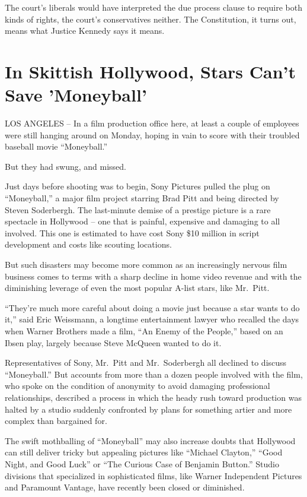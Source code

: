 ﻿\documentclass[12pt]{article}
\begin{document}
The court's liberals would have interpreted the due process clause to require both kinds of rights,
the court's conservatives neither. The Constitution, it turns out, means what Justice Kennedy says it means.

\section{In Skittish Hollywood, Stars Can't Save 'Moneyball'}

LOS ANGELES -- In a film production office here, at least a couple of employees were still hanging
around on Monday, hoping in vain to score with their troubled baseball movie ``Moneyball.''

But they had swung, and missed.

Just days before shooting was to begin, Sony Pictures pulled the plug on ``Moneyball,'' a major film
project starring Brad Pitt and being directed by Steven Soderbergh. The last-minute demise of a
prestige picture is a rare spectacle in Hollywood -- one that is painful, expensive and damaging to
all involved. This one is estimated to have cost Sony \$10 million in script development and costs
like scouting locations.

But such disasters may become more common as an increasingly nervous film business comes to terms
with a sharp decline in home video revenue and with the diminishing leverage of even the most
popular A-list stars, like Mr.~Pitt.

``They're much more careful about doing a movie just because a star wants to do it,'' said Eric
Weissmann, a longtime entertainment lawyer who recalled the days when Warner Brothers made a film,
``An Enemy of the People,'' based on an Ibsen play, largely because Steve McQueen wanted to do it.

Representatives of Sony, Mr.~Pitt and Mr.~Soderbergh all declined to discuss ``Moneyball.'' But
accounts from more than a dozen people involved with the film, who spoke on the condition of
anonymity to avoid damaging professional relationships, described a process in which the heady rush
toward production was halted by a studio suddenly confronted by plans for something artier and more
complex than bargained for.

The swift mothballing of ``Moneyball'' may also increase doubts that Hollywood can still deliver
tricky but appealing pictures like ``Michael Clayton,'' ``Good Night, and Good Luck'' or ``The
Curious Case of Benjamin Button.'' Studio divisions that specialized in sophisticated films, like
Warner Independent Pictures and Paramount Vantage, have recently been closed or diminished.
\end{document}
